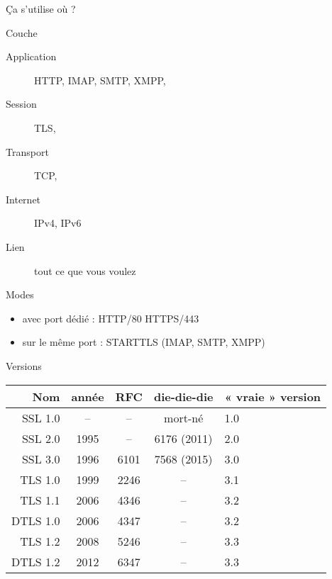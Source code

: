 \documentclass{mpg-ep-slides}
\begin{document}
\begin{frame}{Ça s'utilise où ?}
  \begin{block}{Couche}
    \begin{description}
      \item[Application] HTTP, IMAP, SMTP, XMPP, 
      \item[Session] TLS, 
      \item[Transport] TCP, 
      \item[Internet] IPv4, IPv6
      \item[Lien] tout ce que vous voulez
    \end{description}
  \end{block}

  \begin{block}{Modes}
    \begin{itemize}
      \item avec port dédié : HTTP/80 \textrightarrow{} HTTPS/443
      \item sur le même port : STARTTLS (IMAP, SMTP, XMPP)
    \end{itemize}
  \end{block}
\end{frame}

\begin{frame}{Versions}
  \begin{center}
    \begin{tabular}{rcccl}
      \toprule
      Nom & année & RFC & die-die-die & « vraie » version \\
      \midrule
      SSL 1.0 & -- & -- & mort-né & 1.0 \\
      SSL 2.0 & 1995 & -- & 6176 (2011) & 2.0 \\
      SSL 3.0 & 1996 & 6101 & 7568 (2015) & 3.0 \\
      TLS 1.0 & 1999 & 2246 & -- & 3.1 \\
      TLS 1.1 & 2006 & 4346 & -- & 3.2 \\
      DTLS 1.0 & 2006 & 4347 & -- & 3.2 \\
      TLS 1.2 & 2008 & 5246 & -- & 3.3 \\
      DTLS 1.2 & 2012 & 6347 & -- & 3.3 \\
      \bottomrule
    \end{tabular}
  \end{center}
\end{frame}
\end{document}
